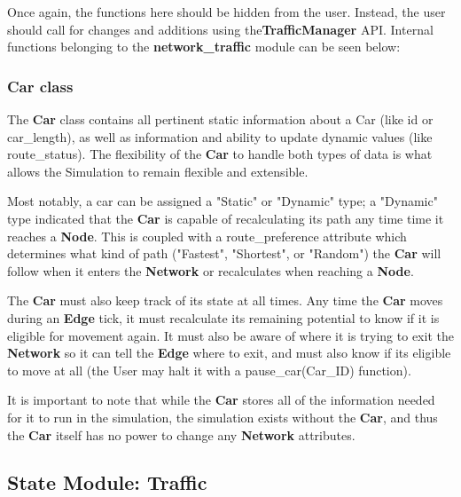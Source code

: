 \noindent Once again, the functions here should be hidden from the user.  Instead, the user should call for changes and additions using the\textbf{TrafficManager} API.  Internal functions belonging to the \textbf{network\_traffic} module can be seen below:

\subsubsection{Car class}

\par The \textbf{Car} class contains all pertinent static information about a Car (like id or car\_length), as well as information and ability to update dynamic values (like route\_status).  The flexibility of the \textbf{Car} to handle both types of data is what allows the Simulation to remain flexible and extensible. \\

\par Most notably, a car can be assigned a "Static" or "Dynamic" type; a "Dynamic" type indicated that the \textbf{Car} is capable of recalculating its path any time time it reaches a \textbf{Node}.  This is coupled with a route\_preference attribute which determines what kind of path ("Fastest", "Shortest", or "Random") the \textbf{Car} will follow when it enters the \textbf{Network} or recalculates when reaching a \textbf{Node}. \\

\par The \textbf{Car} must also keep track of its state at all times.  Any time the \textbf{Car} moves during an \textbf{Edge} tick, it must recalculate its remaining potential to know if it is eligible for movement again.  It must also be aware of where it is trying to exit the \textbf{Network} so it can tell the \textbf{Edge} where to exit, and must also know if its eligible to move at all (the User may halt it with a pause\_car(Car\_ID) function). \\

\par  It is important to note that while the \textbf{Car} stores all of the information needed for it to run in the simulation, the simulation exists without the \textbf{Car}, and thus the \textbf{Car} itself has no power to change any \textbf{Network} attributes.



\subsection{State Module:  Traffic}

